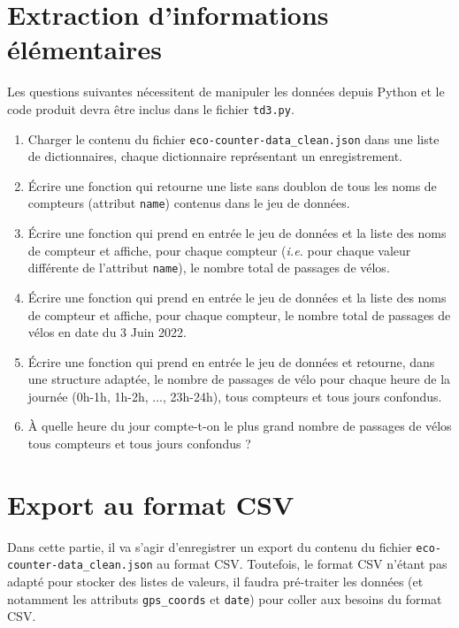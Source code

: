 \documentclass[11pt,a4paper]{article}
\begin{document}
\section{Extraction d'informations élémentaires}

Les questions suivantes nécessitent de manipuler les données depuis Python et le code produit devra être inclus dans le fichier \verb+td3.py+.

\begin{enumerate}
\item Charger le contenu du fichier \verb+eco-counter-data_clean.json+ dans une liste de dictionnaires, chaque dictionnaire représentant un enregistrement.

\item Écrire une fonction qui retourne une liste sans doublon de tous les noms de compteurs (attribut \verb+name+) contenus dans le jeu de données.

\item Écrire une fonction qui prend en entrée le jeu de données et la liste des noms de compteur et affiche, pour chaque compteur (\emph{i.e.} pour chaque valeur différente de l'attribut \verb+name+), le nombre total de passages de vélos.

\item Écrire une fonction qui prend en entrée le jeu de données et la liste des noms de compteur et affiche, pour chaque compteur, le nombre total de passages de vélos en date du 3 Juin 2022.

\item Écrire une fonction qui prend en entrée le jeu de données et retourne, dans une structure adaptée, le nombre de passages de vélo pour chaque heure de la journée (0h-1h, 1h-2h, ..., 23h-24h), tous compteurs et tous jours confondus.

\item À quelle heure du jour compte-t-on le plus grand nombre de passages de vélos tous compteurs et tous jours confondus ?
\end{enumerate}

\section{Export au format CSV}

Dans cette partie, il va s'agir d'enregistrer un export du contenu du fichier \verb+eco-counter-data_clean.json+ au format CSV.
Toutefois, le format CSV n'étant pas adapté pour stocker des listes de valeurs, il faudra pré-traiter les données (et notamment les attributs \verb+gps_coords+ et \verb+date+) pour coller aux besoins du format CSV.
\end{document}
